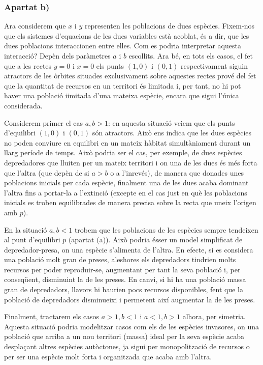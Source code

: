 \documentclass{article}
\begin{document}
\subsubsection*{Apartat b)}

Ara considerem que $x$ i $y$ representen les poblacions de dues espècies. Fixem-nos que els sistemes d'equacions de les dues variables està acoblat, és a dir, que les dues poblacions interaccionen entre elles. Com es podria interpretar aquesta interacció? Depèn dels paràmetres $a$ i $b$ escollits. Ara bé, en tots els casos, el fet que a les rectes $y=0$ i $x=0$ els punts $(1,0)$ i $(0,1)$ respectivament siguin atractors de les òrbites situades exclusivament sobre aquestes rectes prové del fet que la quantitat de recursos en un territori és limitada i, per tant, no hi pot haver una població i\lgem imitada d'una mateixa espècie, encara que sigui l'única considerada.
\par
Considerem primer el cas $a, b>1$: en aquesta situació veiem que els punts d'equilibri $(1,0)$ i $(0,1)$ són atractors. Això ens indica que les dues espècies no poden conviure en equilibri en un mateix hàbitat simultàniament durant un llarg període de temps. Això podria ser el cas, per exemple, de dues espècies depredadores que lluiten per un mateix territori i on una de les dues és més forta que l'altra (que depèn de si $a>b$ o a l'inrevés), de manera que donades unes poblacions inicials per cada espècie, finalment una de les dues acaba dominant l'altra fins a portar-la a l'extinció (excepte en el cas just en què les poblacions inicials es troben equilibrades de manera precisa sobre la recta que uneix l'origen amb $p$). 
\par 
En la situació $a,b<1$ trobem que les poblacions de les espècies sempre tendeixen al punt d'equilibri $p$ (apartat (a)). Això podria ésser un model simplificat de depredador-presa, on una espècie s'alimenta de l'altra. En efecte, si es considera una població molt gran de preses, aleshores els depredadors tindrien molts recursos per poder reproduir-se, augmentant per tant la seva població i, per conseqüent, disminuint la de les preses. En canvi, si hi ha una població massa gran de depredadors, llavors hi haurien pocs recursos disponibles, fent que la població de depredadors disminueixi i permetent així augmentar la de les preses. 
\par 
Finalment, tractarem els casos $a>1, b<1$ i $a<1, b>1$ alhora, per simetria. Aquesta situació podria modelitzar casos com els de les espècies invasores, on una població que arriba a un nou territori (massa) ideal per la seva espècie acaba desplaçant altres espècies autòctones, ja sigui per monopolització de recursos o per ser una espècie molt forta i organitzada que acaba amb l'altra. 
\end{document}
